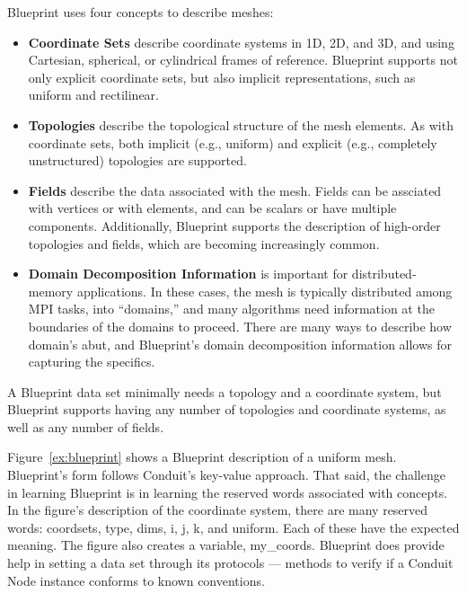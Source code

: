 Blueprint uses four concepts to describe meshes:
\begin{itemize}
  \item \textbf{Coordinate Sets} describe coordinate systems in 1D, 2D, and 3D, and
using Cartesian, spherical, or cylindrical frames of reference.
%
Blueprint supports not only explicit coordinate sets, but also implicit representations,
such as uniform and rectilinear.
  \item \textbf{Topologies} describe the topological structure of the mesh elements.
%
As with coordinate sets, both implicit (e.g., uniform) and explicit
(e.g., completely unstructured) topologies are supported.
  \item \textbf{Fields} describe the data associated with the mesh.
Fields can be assciated with vertices or with elements, and 
can be scalars or have multiple components.
%
Additionally, Blueprint supports the description of high-order
topologies and fields, which are becoming increasingly common.
  \item \textbf{Domain Decomposition Information} is important for distributed-memory applications.
%
In these cases, the mesh is typically distributed among MPI tasks, into ``domains,'' and
many algorithms need information at the boundaries of the domains to proceed.
%
There are many ways to describe how domain's abut, and Blueprint's domain decomposition information 
allows for capturing the specifics.
\end{itemize}
A Blueprint data set minimally needs a topology and a coordinate system,
but Blueprint supports having any number of topologies and coordinate
systems, as well as any number of fields.
%


Figure~\ref{ex:blueprint} shows a Blueprint description of a uniform mesh.
%
Blueprint's form follows Conduit's key-value approach.
%
That said, the challenge in learning Blueprint is in learning the reserved words associated
with concepts.  
%
In the figure's description of the coordinate system, there are many reserved words:
coordsets, type, dims,  i, j, k, and uniform.
%
Each of these have the expected meaning.
%
The figure also creates a variable, my\_coords.
%
Blueprint does provide help in setting a data set through its protocols ---
methods to verify if a Conduit Node instance conforms to known conventions. 


